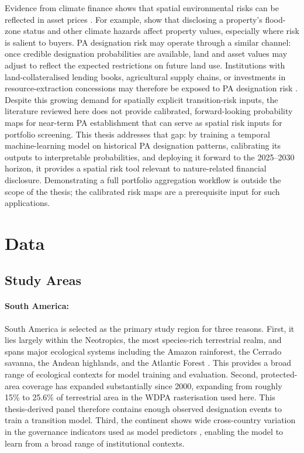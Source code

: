 \documentclass[12pt]{article}
\theoremstyle{break}
\begin{document}
Evidence from climate finance shows that spatial environmental risks can be reflected in
asset prices \citep{campiglio2023}. For example, \citet{hino2021} show that disclosing a
property's flood-zone status and other climate hazards affect property values, especially where risk is salient
to buyers. PA designation risk may operate through a similar channel: once credible
designation probabilities are available, land and asset values may adjust to reflect the
expected restrictions on future land use. Institutions with land-collateralised lending books,
agricultural supply chains, or investments in resource-extraction concessions may therefore
be exposed to PA designation risk \citep{tnfd2023}.
Despite this growing demand for spatially explicit transition-risk inputs, the
literature reviewed here does not provide calibrated, forward-looking probability
maps for near-term PA establishment that can serve as spatial risk inputs for
portfolio screening. This thesis addresses that gap: by training a temporal machine-learning model on historical
PA designation patterns, calibrating its outputs to interpretable probabilities, and
deploying it forward to the 2025--2030 horizon, it provides a spatial risk tool
relevant to nature-related financial disclosure. Demonstrating a full portfolio
aggregation workflow is outside the scope of the thesis; the calibrated risk maps are
a prerequisite input for such applications.

\section{Data}
\label{sec:data_section}

\subsection{Study Areas}
\label{sec:study_areas}

\paragraph{South America:}
South America is selected as the primary study region for three reasons. First, it
lies largely within the Neotropics, the most species-rich terrestrial realm, and spans
major ecological systems including the Amazon rainforest, the Cerrado savanna, the
Andean highlands, and the Atlantic Forest \citep{antonelli2018, ipbesamericas2018}.
This provides a broad range of ecological contexts for model training and evaluation.
Second, protected-area coverage has expanded substantially since
2000, expanding from roughly 15\% to 25.6\% of terrestrial area in the WDPA
rasterisation used here. This thesis-derived panel therefore contains enough
observed designation events to train a transition model.
Third, the
continent shows wide cross-country variation in the governance indicators used as
model predictors \citep{wgi2025, vdem2025}, enabling the model to learn from a broad
range of institutional contexts.
\end{document}
